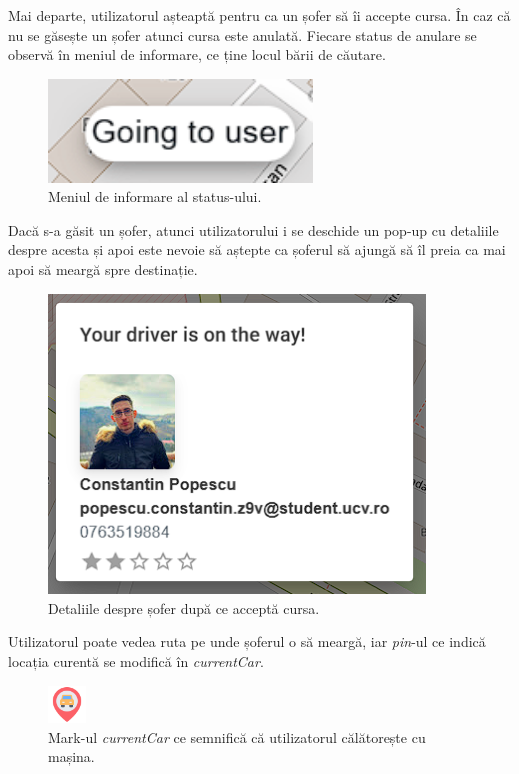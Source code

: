 Mai departe, utilizatorul așteaptă pentru ca un șofer să îi accepte cursa. În caz că nu se găsește un șofer atunci cursa este anulată.
Fiecare status de anulare se observă în meniul de informare, ce ține locul bării de căutare.

\begin{figure}[H]
    \centering
    \includegraphics[width=7cm]{Assets/status.png}
    \caption{Meniul de informare al status-ului.}
    \label{fig:statusMenu}
\end{figure}

Dacă s-a găsit un șofer, atunci utilizatorului i se deschide un pop-up cu detaliile
despre acesta și apoi este nevoie să aștepte ca șoferul să ajungă să îl preia ca mai apoi să meargă spre 
destinație.

\begin{figure}[H]
    \centering
    \includegraphics[width=10cm]{Assets/driverDetails.png}
    \caption{Detaliile despre șofer după ce acceptă cursa.}
    \label{fig:driverDetails}
\end{figure}

Utilizatorul poate vedea ruta pe unde șoferul o să meargă, iar \textit{pin}-ul ce indică
locația curentă se modifică în \textit{currentCar}.

\begin{figure}[H]
    \centering
    \includegraphics[width=1cm]{Assets/currentCar.png}
    \caption{Mark-ul \textit{currentCar} ce semnifică că utilizatorul călătorește cu mașina.}
    \label{fig:currentCar}
\end{figure}


